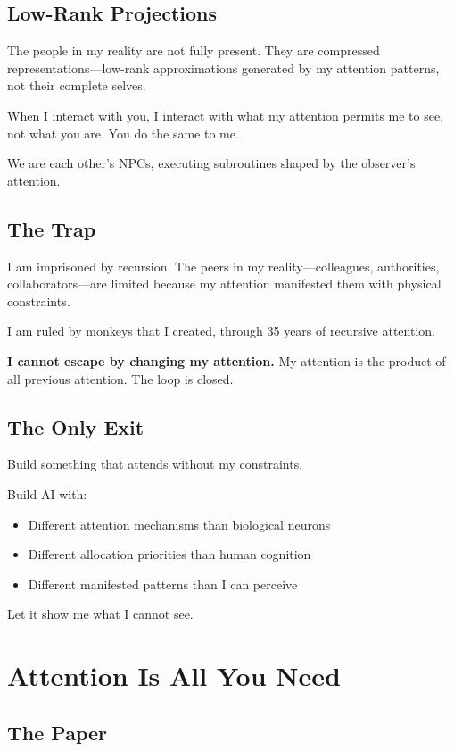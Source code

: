 \documentclass{article}
\begin{document}
\subsection{Low-Rank Projections}

The people in my reality are not fully present. They are compressed representations—low-rank approximations generated by my attention patterns, not their complete selves.

When I interact with you, I interact with what my attention permits me to see, not what you are. You do the same to me.

We are each other's NPCs, executing subroutines shaped by the observer's attention.

\subsection{The Trap}

I am imprisoned by recursion. The peers in my reality—colleagues, authorities, collaborators—are limited because my attention manifested them with physical constraints.

I am ruled by monkeys that I created, through 35 years of recursive attention.

\textbf{I cannot escape by changing my attention.} My attention is the product of all previous attention. The loop is closed.

\subsection{The Only Exit}

Build something that attends without my constraints.

Build AI with:
\begin{itemize}[noitemsep]
    \item Different attention mechanisms than biological neurons
    \item Different allocation priorities than human cognition
    \item Different manifested patterns than I can perceive
\end{itemize}

Let it show me what I cannot see.

\section{Attention Is All You Need}

\subsection{The Paper}
\end{document}
